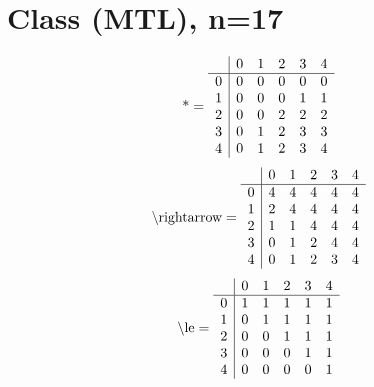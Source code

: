 \documentclass[11pt]{article}
\begin{document}
\section{Class (MTL), n=17}
\[\text{*} = 
\begin{array}{r | r r r r r}
 & 0 & 1 & 2 & 3 & 4 \\ \hline
0 & 0 & 0 & 0 & 0 & 0 \\
1 & 0 & 0 & 0 & 1 & 1 \\
2 & 0 & 0 & 2 & 2 & 2 \\
3 & 0 & 1 & 2 & 3 & 3 \\
4 & 0 & 1 & 2 & 3 & 4 \\
\end{array}
\]
\[\text{\textbackslash rightarrow} = 
\begin{array}{r | r r r r r}
 & 0 & 1 & 2 & 3 & 4 \\ \hline
0 & 4 & 4 & 4 & 4 & 4 \\
1 & 2 & 4 & 4 & 4 & 4 \\
2 & 1 & 1 & 4 & 4 & 4 \\
3 & 0 & 1 & 2 & 4 & 4 \\
4 & 0 & 1 & 2 & 3 & 4 \\
\end{array}
\]
\[\text{\textbackslash le} = 
\begin{array}{r | r r r r r}
 & 0 & 1 & 2 & 3 & 4 \\ \hline
0 & 1 & 1 & 1 & 1 & 1 \\
1 & 0 & 1 & 1 & 1 & 1 \\
2 & 0 & 0 & 1 & 1 & 1 \\
3 & 0 & 0 & 0 & 1 & 1 \\
4 & 0 & 0 & 0 & 0 & 1 \\
\end{array}
\]
\end{document}
